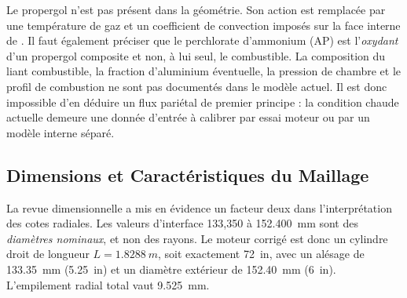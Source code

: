 \documentclass[oneside,openany]{amsdtx}
\begin{document}
Le propergol n'est pas présent dans la géométrie. Son action est remplacée par
une température de gaz et un coefficient de convection imposés sur la face
interne de . Il faut également préciser que le perchlorate d'ammonium
(AP) est l'\emph{oxydant} d'un propergol composite et non, à lui seul, le
combustible. La composition du liant combustible, la fraction d'aluminium
éventuelle, la pression de chambre et le profil de combustion ne sont pas
documentés dans le modèle actuel. Il est donc impossible d'en déduire un flux
pariétal de premier principe : la condition chaude actuelle demeure une donnée
d'entrée à calibrer par essai moteur ou par un modèle interne séparé.

\subsection{Dimensions et Caractéristiques du Maillage}

La revue dimensionnelle a mis en évidence un facteur deux dans l'interprétation
des cotes radiales. Les valeurs d'interface 133,350 à \SI{152.400}{mm} sont des
\emph{diamètres nominaux}, et non des rayons. Le moteur corrigé est donc un
cylindre droit de longueur \(L=\SI{1.8288}{m}\), soit exactement \SI{72}{in},
avec un alésage de \SI{133.35}{mm} (\SI{5.25}{in}) et un diamètre extérieur de
\SI{152.40}{mm} (\SI{6}{in}). L'empilement radial total vaut
\SI{9.525}{mm}.

\begin{center}
\end{center}
\end{document}
